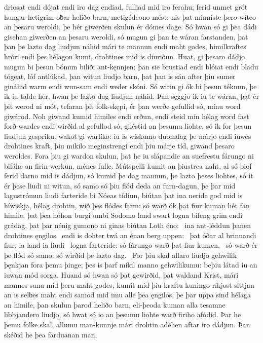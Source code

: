driosat endi dójat endi iro dag endiad,
fulliad mid iro ferahu; ferid unmet grót
hungar hetigrim oƀar heliðo barn,
metigédeono mést: nis þat minniste
þero wíteo an þesaru weroldi, þe hér giwerðen skulun
ér dómes dage. Só hwan só gi þea dádi gisehan
giwerðen an þesaru weroldi, só mugun gi þan te wáran farstanden,
þat þan þe lazto dag liudjun náhid
mári te mannun endi maht godes,
himilkraftes hróri endi þes hélagon kumi,
drohtines mid is diuriðun. Huat, gi þesaro dádjo mugun
bi þesun bómun biliði ant-kęnnjen:
þan sie brustiad endi blóiat endi bladu tógeat,
lóf antlúkad, þan witun liudjo barn,
þat þan is sán after þiu sumer gináhid
warm endi wun-sam endi weder skóni.
Só witin gi ók bi þesun téknun, þe ik iu talde hér,
hwan þe lazto dag liudjun náhid.
Þan sęggjo ik iu te wáran, þat ér þit werod ni mót,
tefaran þit folk-skępi, ér þan werðe gefullid só,
mínu word giwárod. Noh giwand kumid
himiles endi erðun, endi steid mín hélag word
fast forð-wardes endi wirðid al gefullod só,
giléstid an þesumu liohte, só ik for þesun liudjun gespriku.
wakot gi warlíko: iu is wiskumo
duomdag þe márjo endi iuwes drohtines kraft,
þiu mikilo meginstrengi endi þiu márje tíd,
giwand þesaro weroldes. Fora þiu gi wardon skulun,
þat he iu slápandie an suefrestu
fárungo ni bifáhe an firin-werkun,
ménes fulle. Mútspelli kumit
an þiustrea naht, al só þiof ferid
darno mid is dádjun, só kumid þe dag mannun,
þe lazto þeses liohtes, só it ér þese liudi ni witun,
só samo só þiu flód deda an furn-dagun,
þe þar mid lagustrómun liudi farteride
bi Nóeas tídiun, biútan þat ina neride god
mid is híwiskja, hélag drohtin,
wið þes flódes farm: só warð ók þat fiur kuman
hét fan himile, þat þea hóhon burgi
umbi Sodomo land swart logna bifeng
grim endi grádag, þat þar nénig gumono ni ginas
biútan Loth éno: \hld\ ina ant-léddun þanen
drohtines ęngilos \hld\ endi is dohter twá
an énan berg uppen: \hld\ þat óðar al brinnandi fiur,
ia land ia liudi \hld\ logna farteride:
só fárungo warð þat fiur kumen, \hld\ só warð ér þe flód só samo:
só wirðid þe lazto dag. \hld\ For þiu skal allaro liudjo gehwilik
þęnkjan fora þemu þinge; þes is þarf mikil
manno gehwilikumu: beþiu látad iu an iuwan mód sorga.
Huand só hwan só þat gewirðid, þat waldand Krist,
mári mannes sunu mid þeru maht godes,
kumit mid þiu kraftu kuningo ríkjost
sittjan an is selƀes maht endi samod mid imu
alle þea ęngilos, þe þar uppa sind
hélaga an himile, þan skulun þarod heliðo barn,
eli-þeoda kuman alla tesamne
libbjandero liudjo, só hwat só io an þesumu liohte warð
firiho afódid. Þar he þemu folke skal,
allumu man-kunnje mári drohtin
adélien aftar iro dádjun. Þan skéðid he þea farduanan man,
